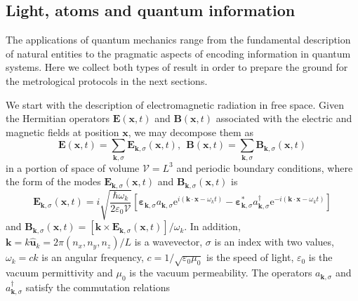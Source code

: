\subsection{Light, atoms and quantum information}
\label{subsec:qapp}

The applications of quantum mechanics range from the fundamental description of natural entities to the pragmatic aspects of encoding information in quantum systems. Here we collect both types of result in order to prepare the ground for the metrological protocols in the next sections. 

We start with the description of electromagnetic radiation in free space. Given the Hermitian operators $\boldsymbol{E}(\boldsymbol{x},t)$ and $\boldsymbol{B}(\boldsymbol{x},t)$ associated with the electric and magnetic fields at position $\boldsymbol{x}$, we may decompose them as
\begin{equation}
\boldsymbol{E}(\boldsymbol{x},t) = \sum_{\boldsymbol{k}, \sigma} \boldsymbol{E}_{\boldsymbol{k}, \sigma}(\boldsymbol{x},t), ~~ \boldsymbol{B}(\boldsymbol{x},t) = \sum_{\boldsymbol{k}, \sigma} \boldsymbol{B}_{\boldsymbol{k}, \sigma}(\boldsymbol{x},t)
\end{equation}
in a portion of space of volume $\mathcal{V} = L^3$ and periodic boundary conditions, where the form of the modes $\boldsymbol{E}_{\boldsymbol{k}, \sigma}(\boldsymbol{x},t)$ and $\boldsymbol{B}_{\boldsymbol{k}, \sigma}(\boldsymbol{x},t)$ is \cite{barnett2002, ballentine1998}
\begin{equation}
\boldsymbol{E}_{\boldsymbol{k}, \sigma}(\boldsymbol{x},t) = i \sqrt{\frac{\hbar \omega_k}{2\varepsilon_0 \mathcal{V}}} \left[\boldsymbol{\varepsilon}_{\boldsymbol{k},\sigma}a_{\boldsymbol{k},\sigma}\mathrm{e}^{i(\boldsymbol{k}\cdot \boldsymbol{x}-\omega_k t)} - \boldsymbol{\varepsilon}_{\boldsymbol{k},\sigma}^{*} a_{\boldsymbol{k},\sigma}^\dagger\mathrm{e}^{-i(\boldsymbol{k}\cdot \boldsymbol{x}-\omega_k t)} \right]
\end{equation}
and $\boldsymbol{B}_{\boldsymbol{k}, \sigma}(\boldsymbol{x},t) = [\boldsymbol{k}\times\boldsymbol{E}_{\boldsymbol{k}, \sigma}(\boldsymbol{x},t)]/\omega_k$. In addition, $\boldsymbol{k} = k\boldsymbol{\hat{u}}_k = 2\pi(n_x, n_y, n_z)/L$ is a wavevector, $\sigma$ is an index with two values, $\omega_k = c k$ is an angular frequency, $c = 1/\sqrt{\varepsilon_0 \mu_0}$ is the speed of light, $\varepsilon_0$ is the vacuum permittivity and $\mu_0$ is the vacuum permeability. The operators $a_{\boldsymbol{k},\sigma}$ and $a_{\boldsymbol{k},\sigma}^\dagger$ satisfy the commutation relations 
